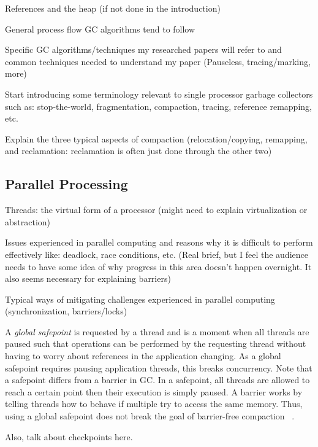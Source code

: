 \documentclass{sig-alternate}
\begin{document}
References and the heap (if not done in the introduction)

General process flow GC algorithms tend to follow

Specific GC algorithms/techniques my researched papers will 
refer to and common techniques needed to understand my paper 
(Pauseless, tracing/marking, more)

Start introducing some terminology relevant to single processor 
garbage collectors such as: stop-the-world, fragmentation, compaction, 
tracing, reference remapping, etc.

Explain the three typical aspects of compaction 
(relocation/copying, remapping, and reclamation: 
reclamation is often just done through the other two)

\subsection{Parallel Processing}
\label{sec:parallelProcessing}

Threads: the virtual form of a processor (might need to 
explain virtualization or abstraction)

Issues experienced in parallel computing and reasons why it 
is difficult to perform effectively like: deadlock, race conditions, 
etc. (Real brief, but I feel the audience needs to have some idea of 
why progress in this area doesn't happen overnight. It also seems 
necessary for explaining barriers)

Typical ways of mitigating challenges experienced in parallel 
computing (synchronization, barriers/locks)

A \emph{global safepoint} is requested by a thread and is a moment when all 
threads are paused such that operations can be performed by the requesting thread without having to worry 
about references in the application changing. As a global safepoint requires pausing application
threads, this breaks concurrency.
Note that a safepoint differs from a barrier in GC. In a safepoint,
all threads are allowed to reach a certain point then their execution is simply paused.
A barrier works by telling threads how to behave if multiple try to access the same
memory. Thus, using a global safepoint does not break the goal of barrier-free compaction
~\cite{Humble:2015}.

Also, talk about checkpoints here.
\end{document}
